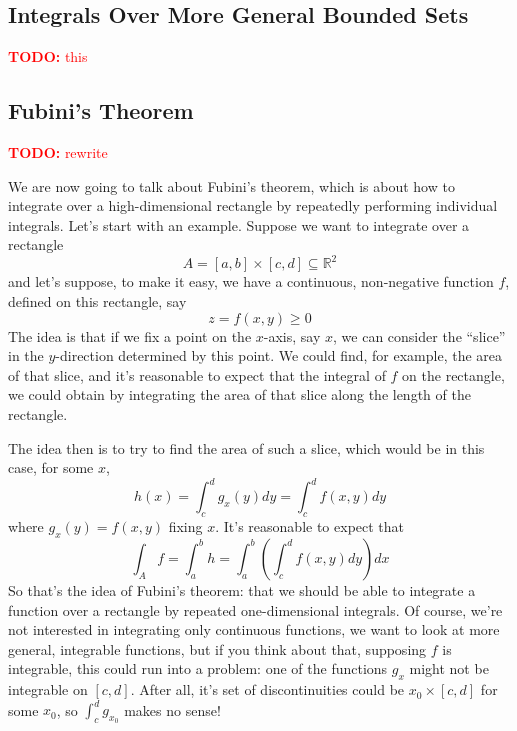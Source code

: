\documentclass{article}
\newcommand{\reals}[0]{\mathbb{R}}
\newcommand{\TODO}[1]{\textcolor{red}{\textbf{TODO:} #1}}
\begin{document}
\subsection{Integrals Over More General Bounded Sets}

\TODO{this}

\subsection{Fubini's Theorem}

\TODO{rewrite}

We are now going to talk about Fubini's theorem, which is about how to integrate over a high-dimensional rectangle by repeatedly performing individual integrals. Let's start with an example. Suppose we want to integrate over a rectangle
\begin{equation}
  A = [a, b] \times [c, d] \subseteq \reals^2
\end{equation}
and let's suppose, to make it easy, we have a continuous, non-negative function \(f\), defined on this rectangle, say
\begin{equation}
  z = f(x, y) \geq 0
\end{equation}
The idea is that if we fix a point on the \(x\)-axis, say \(x\), we can consider the ``slice'' in the \(y\)-direction determined by this point. We could find, for example, the area of that slice, and it's reasonable to expect that the integral of \(f\) on the rectangle, we could obtain by integrating the area of that slice along the length of the rectangle.

The idea then is to try to find the area of such a slice, which would be in this case, for some \(x\),
\begin{equation}
  h(x) = \int_c^dg_x(y)dy = \int_c^df(x, y)dy
\end{equation}
where \(g_x(y) = f(x, y)\) fixing \(x\). It's reasonable to expect that
\begin{equation}
  \int_Af = \int_a^bh = \int_a^b\left(\int_c^df(x, y)dy\right)dx
\end{equation}
So that's the idea of Fubini's theorem: that we should be able to integrate a function over a rectangle by repeated one-dimensional integrals. Of course, we're not interested in integrating only continuous functions, we want to look at more general, integrable functions, but if you think about that, supposing \(f\) is integrable, this could run into a problem: one of the functions \(g_x\) might not be integrable on \([c, d]\). After all, it's set of discontinuities could be \(x_0 \times [c, d]\) for some \(x_0\), so \(\int_c^dg_{x_0}\) makes no sense!
\end{document}
